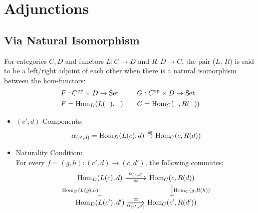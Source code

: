 \section{Adjunctions}

\subsection{Via Natural Isomorphism}

\begin{definition}
  For categories $C, D$ and functors $L: C\to D$ and $R: D\to C$, the pair ($L$,
  $R$) is said to be a left/right adjoint of each other when there is a natural
  isomorphism between the hom-functors:
  \parencite{leinster:basic_category_theory}
  \[
    \begin{aligned}
      F&: C^{\mathrm{op}} \times D \to \mathrm{Set}\\
      F&=\mathrm{Hom}_D(L(\underline{\ \ }), \underline{\ \ })
    \end{aligned}
    \qquad
    \begin{aligned}
      G&: C^{\mathrm{op}} \times D \to \mathrm{Set}\\
      G&=\mathrm{Hom}_C(\underline{\ \ }, R(\underline{\ \ }))
    \end{aligned}
  \]

  \begin{itemize}
    \item $(c', d)$-Components:
      \[
        \alpha_{(c', d)}
          = \mathrm{Hom}_D(L(c), d) \overset{\cong}{\to} \mathrm{Hom}_C(c, R(d))\\
      \]
    \item Naturality Condition:\\
      For every $f = (g, h): (c', d) \to (c, d')$, the following commutes:
      \[\begin{tikzcd}[ampersand replacement=\&]
        {\Hom_D(L(c), d)} \& {\Hom_C(c, R(d))} \\
        {\Hom_D(L(c'),d')} \& {\Hom_C(c',R(d'))}
        \arrow["{\Hom_D(L(g), h)}"', from=1-1, to=2-1]
        \arrow["{\Hom_C(g, R(h))}", from=1-2, to=2-2]
        \arrow["{\alpha_{(c, d)}}", from=1-1, to=1-2]
        \arrow["{\alpha_{(c',d')}}"', from=2-1, to=2-2]
        \arrow["\cong"', from=1-1, to=1-2]
        \arrow["\cong", from=2-1, to=2-2]
      \end{tikzcd}\]
  \end{itemize}
\end{definition}

